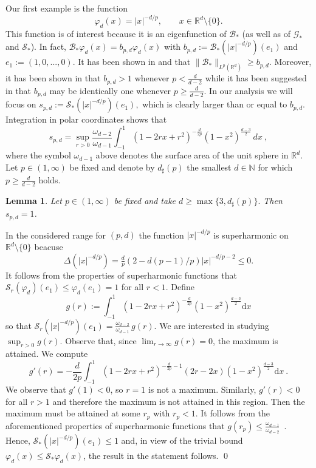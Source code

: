 \documentclass[a4paper, reqno]{amsart}
\newtheorem{lemma}[thm]{Lemma}
\theoremstyle{definition}
\newcommand{\R}{{\mathbb R}}
\newcommand{\dd}{{\mathrm d}}
\newcommand{\mG}{\mathcal{G}}
\newcommand{\mS}{\mathcal{S}}
\begin{document}
Our first example is the function \[\varphi_d(x)=|x|^{-d/p},\qquad x\in \R^d\setminus\{0\}.\] This function is of interest because it is an eigenfunction of $\mathcal{B}_\ast$ (as well as of $\mG_\ast$ and $\mS_\ast$). In fact, $\mathcal{B}_\ast \varphi_d (x)= b_{p,d} \varphi_d(x)$ with $b_{p,d}:=\mathcal{B}_\ast(|x|^{-d/p})(e_1)$ and $e_1:=(1,0,...,0)$. It has been shown in \cite[Eq.~3.1]{CG1} and  \cite[Theorem~3.2]{DSS} that  $\| \mathcal{B}_\ast \|_{L^p(\mathbb{R}^d)} \geq b_{p,d}$. Moreover, it has been shown in \cite[Lemma~3.4]{DSS} that $b_{p,d}>1$ whenever $p<\tfrac{d}{d-2}$ while it has been suggested in \cite[p.~478]{DSS} that $b_{p,d}$ may be identically one whenever $p\geq \tfrac{d}{d-2}$. In our analysis we will focus on $s_{p,d}:=\mS_*(|x|^{-d/p})(e_1),$ which is clearly larger than or equal to $b_{p,d}.$ Integration in polar coordinates shows that
\[
s_{p,d}=\sup_{r>0}
\frac{\omega_{d-2}}{\omega_{d-1}} \int_{-1}^{1} (1 - 2r x + r^2)^{-\frac{d}{2p}} (1 - x^2)^{\frac{d - 3}{2}} \, dx ~,
\]
where the symbol $\omega_{d-1}$ above denotes the surface area of the unit sphere in $\R^d.$
Let $p\in (1,\infty)$ be fixed and denote by $d_\sharp(p)$ the smallest $d\in\mathbb{N}$ for which $p\geq \frac{d}{d-2}$ holds.
\begin{lemma}
    Let $p\in (1,\infty)$ be fixed and take $d\geq \max \lbrace 3, d_\sharp(p) \rbrace.$ Then $s_{p,d}=1$.
\end{lemma}
\proof
In the considered range for $(p,d)$ the function $|x|^{-d/p}$ is superharmonic on $\mathbb{R}^d\setminus \lbrace 0 \rbrace$ beacuse \[\Delta(|x|^{-d/p})=\tfrac{d}{p}(2-d(p-1)/p)|x|^{-d/p-2}\leq 0.\] It follows from the properties of superharmonic functions that $\mathcal{S}_r(\varphi_d)(e_1)\leq \varphi_d(e_1)=1$ for all $r<1$. Define
$$g(r):=\int_{-1}^1(1-2rx+r^2)^{-\tfrac{d}{2p}}(1-x^2)^{\tfrac{d-3}{2}}\dd x$$
so that $\mathcal{S}_r(|x|^{-d/p})(e_1)=\tfrac{\omega_{d-2}}{\omega_{d-1}}\, g(r)$. We are interested in studying $\sup_{r>0}g(r)$. Observe that, since $\lim_{r\rightarrow\infty}g(r)=0$, the maximum is attained. We compute
$$g'(r)=-\frac{d}{2p}\int_{-1}^1(1-2rx+r^2)^{-\tfrac{d}{2p}-1}(2r-2x)(1-x^2)^{\tfrac{d-3}{2}}\dd x~.$$
We observe that $g'(1)<0$, so $r=1$  is not a maximum. Similarly, $g'(r)<0$ for all $r>1$ and therefore the maximum is not attained in this region. 
Then the maximum must be attained at some $r_p$ with $r_p<1$. It follows from the aforementioned properties of superharmonic functions that $g(r_p)\leq \frac{\omega_{d-1}}{\omega_{d-2}}$~. 
Hence, $\mathcal{S}_\ast(|x|^{-d/p})(e_1)\leq 1$ and, in view of the trivial bound $\varphi_d(x)\leq \mathcal{S}_\ast \varphi_d(x)$, the result in the statement follows.
\qed
\end{document}
